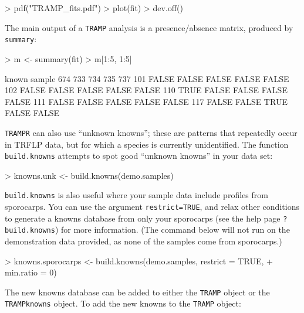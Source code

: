 \documentclass[a4paper]{article}
\newcommand\code\texttt
\newcommand{\help}[1]{\texttt{?#1}}
\begin{document}
\begin{Schunk}
\begin{Sinput}
> pdf("TRAMP_fits.pdf")
> plot(fit)
> dev.off()
\end{Sinput}
\end{Schunk}

The main output of a \code{TRAMP} analysis is a presence/absence
matrix, produced by \code{summary}:

\begin{Schunk}
\begin{Sinput}
> m <- summary(fit)
> m[1:5, 1:5]
\end{Sinput}
\begin{Soutput}
      known
sample   674   733   734   735   737
   101 FALSE FALSE FALSE FALSE FALSE
   102 FALSE FALSE FALSE FALSE FALSE
   110  TRUE FALSE FALSE FALSE FALSE
   111 FALSE FALSE FALSE FALSE FALSE
   117 FALSE FALSE  TRUE FALSE FALSE
\end{Soutput}
\end{Schunk}

\code{TRAMPR} can also use ``unknown knowns''; these are patterns that
repeatedly occur in TRFLP data, but for which a species is currently
unidentified.  The function \code{build.knowns} attempts to spot good
``unknown knowns'' in your data set:

\begin{Schunk}
\begin{Sinput}
> knowns.unk <- build.knowns(demo.samples)
\end{Sinput}
\end{Schunk}

\code{build.knowns} is also useful where your sample data include
profiles from sporocarps.  You can use the argument
\code{restrict=TRUE}, and relax other conditions to generate a knowns
database from only your sporocarps (see the help page
\help{build.knowns}) for more information.  (The command below will
not run on the demonstration data provided, as none of the samples
come from sporocarps.)

\begin{Schunk}
\begin{Sinput}
> knowns.sporocarps <- build.knowns(demo.samples, restrict = TRUE, 
+     min.ratio = 0)
\end{Sinput}
\end{Schunk}

The new knowns database can be added to either the \code{TRAMP} object
or the \code{TRAMPknowns} object.  To add the new knowns to the
\code{TRAMP} object:
\end{document}
